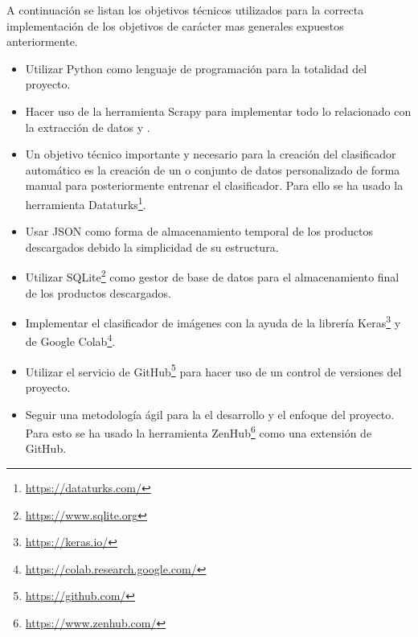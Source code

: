 A continuación se listan los objetivos técnicos utilizados para la correcta implementación de los objetivos de carácter mas generales expuestos anteriormente.

\begin{itemize}
	\item Utilizar Python como lenguaje de programación para la totalidad del proyecto.
	\item Hacer uso de la herramienta Scrapy para implementar todo lo relacionado con la extracción de datos y .
	\item Un objetivo técnico importante y necesario para la creación del clasificador automático es la creación de un  o conjunto de datos personalizado de forma manual para posteriormente entrenar el clasificador. Para ello se ha usado la herramienta Dataturks\footnote{\url{https://dataturks.com/}}.
	\item Usar JSON como forma de almacenamiento temporal de los productos descargados debido la simplicidad de su estructura.
	\item Utilizar SQLite\footnote{\url{https://www.sqlite.org}} como gestor de base de datos para el almacenamiento final de los productos descargados.
	\item Implementar el clasificador de imágenes con la ayuda de la librería Keras\footnote{\url{https://keras.io/}} y de Google Colab\footnote{\url{https://colab.research.google.com/}}.
	\item Utilizar el servicio de GitHub\footnote{\url{https://github.com/}} para hacer uso de un control de versiones del proyecto.
	\item Seguir una metodología ágil para la el desarrollo y el enfoque del proyecto. Para esto se ha usado la herramienta ZenHub\footnote{\url{https://www.zenhub.com/}} como una extensión de GitHub.
\end{itemize}